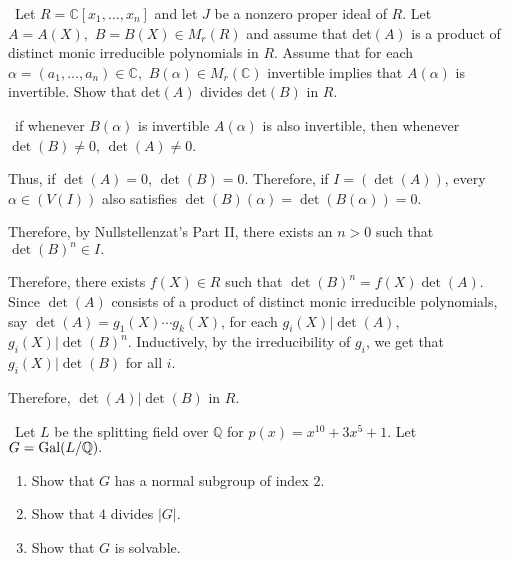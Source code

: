 \documentclass[12pt]{AlgebraQual}
\begin{document}
\begin{problem} $\,$
Let $R=\mathbb{C}[x_1,...,x_n]$ and let $J$ be a nonzero proper ideal of $R.$ Let $A=A(X),$ $B=B(X)\in M_r(R)$ and assume that det$(A)$ is a product of distinct monic irreducible polynomials in $R.$ Assume that for each $\alpha=(a_1,...,a_n)\in\mathbb{C},$ $B(\alpha)\in M_r(\mathbb{C})$ invertible implies that $A(\alpha)$ is invertible. Show that det$(A)$ divides det$(B)$ in $R.$
\end{problem}


\begin{solution}$\,$
if whenever $B(\alpha)$ is invertible $A(\alpha)$ is also invertible, then whenever $\det(B)\not=0$, $\det(A)\not=0.$

Thus, if $\det(A)=0$, $\det(B)=0$. Therefore, if $I=(\det(A))$, every $\alpha\in (V(I))$ also satisfies $\det(B)(\alpha)=\det(B(\alpha))=0$.

Therefore, by Nullstellenzat's Part II, there exists an $n>0$ such that $\det(B)^n\in I.$

Therefore, there exists $f(X)\in R$ such that $\det(B)^n=f(X)\det(A).$ Since $\det(A)$ consists of a product of distinct monic irreducible polynomials, say $\det(A)=g_1(X)\cdots g_k(X)$, for each $g_i(X)|\det(A),$ $g_i(X)|\det(B)^n$. Inductively, by the irreducibility of $g_i$, we get that $g_i(X)|\det(B)$ for all $i.$

Therefore, $\det(A)|\det(B)$ in $R.$
\end{solution}
\newpage



\begin{problem} $\,$
Let $L$ be the splitting field over $\mathbb{Q}$ for $p(x)=x^{10}+3x^5+1$. Let $G=\text{Gal}(L/\mathbb{Q}).$
\begin{enumerate}[label=(\alph*)]
    \item Show that $G$ has a normal subgroup of index $2$.
    \item Show that $4$ divides $|G|.$
    \item Show that $G$ is solvable.
\end{enumerate}
\end{problem}
\end{document}
